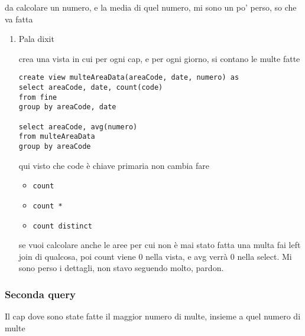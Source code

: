 \documentclass[11pt]{article}
\begin{document}
da calcolare un numero, e la media di quel numero, mi sono un po' perso, so che va fatta
\begin{enumerate}
\item Pala dixit
\label{sec:orgedacd9e}

crea una vista in cui per ogni cap, e per ogni giorno, si contano le multe fatte
\begin{verbatim}
create view multeAreaData(areaCode, date, numero) as
select areaCode, date, count(code)
from fine
group by areaCode, date

select areaCode, avg(numero)
from multeAreaData
group by areaCode
\end{verbatim}

qui visto che code è chiave primaria non cambia fare
\begin{itemize}
\item \texttt{count}
\item \texttt{count *}
\item \texttt{count distinct}
\end{itemize}

se vuoi calcolare anche le aree per cui non è mai stato fatta una multa fai left join di
qualcosa, poi count viene 0 nella vista, e avg verrà 0 nella select.
Mi sono perso i dettagli, non stavo seguendo molto, pardon.
\end{enumerate}

\subsubsection{Seconda query}
\label{sec:org64a0180}
Il cap dove sono state fatte il maggior numero di multe, insieme a quel numero di multe
\end{document}
